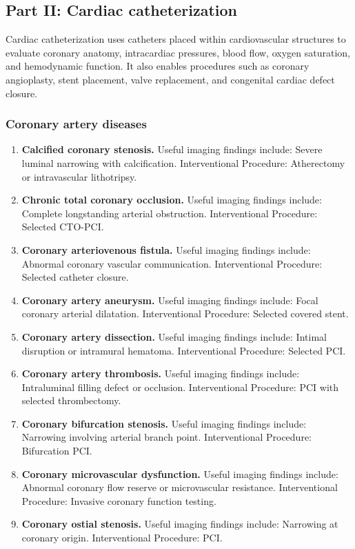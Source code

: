 \subsection{Part II: Cardiac catheterization}
Cardiac catheterization uses catheters placed within cardiovascular structures to evaluate coronary anatomy, intracardiac pressures, blood flow, oxygen saturation, and hemodynamic function. It also enables procedures such as coronary angioplasty, stent placement, valve replacement, and congenital cardiac defect closure.

\subsubsection{Coronary artery diseases}
\begin{enumerate}[leftmargin=*,itemsep=0.45em,topsep=0.4em]
\item \textbf{Calcified coronary stenosis.} Useful imaging findings include: Severe luminal narrowing with calcification. Interventional Procedure: Atherectomy or intravascular lithotripsy.
\item \textbf{Chronic total coronary occlusion.} Useful imaging findings include: Complete longstanding arterial obstruction. Interventional Procedure: Selected CTO-PCI.
\item \textbf{Coronary arteriovenous fistula.} Useful imaging findings include: Abnormal coronary vascular communication. Interventional Procedure: Selected catheter closure.
\item \textbf{Coronary artery aneurysm.} Useful imaging findings include: Focal coronary arterial dilatation. Interventional Procedure: Selected covered stent.
\item \textbf{Coronary artery dissection.} Useful imaging findings include: Intimal disruption or intramural hematoma. Interventional Procedure: Selected PCI.
\item \textbf{Coronary artery thrombosis.} Useful imaging findings include: Intraluminal filling defect or occlusion. Interventional Procedure: PCI with selected thrombectomy.
\item \textbf{Coronary bifurcation stenosis.} Useful imaging findings include: Narrowing involving arterial branch point. Interventional Procedure: Bifurcation PCI.
\item \textbf{Coronary microvascular dysfunction.} Useful imaging findings include: Abnormal coronary flow reserve or microvascular resistance. Interventional Procedure: Invasive coronary function testing.
\item \textbf{Coronary ostial stenosis.} Useful imaging findings include: Narrowing at coronary origin. Interventional Procedure: PCI.

\end{enumerate}
